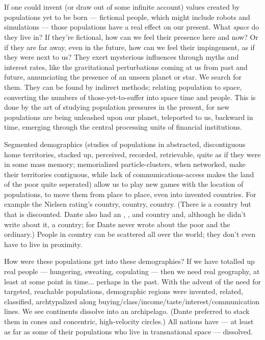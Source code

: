 \chapter{}

If one could invent (or draw out of some
infinite account) values created by populations yet to be born --- fictional people, which
might include robots and simulations --- those
populations have a real effect on our present.
What \emph{space} do they live in? If they're fictional, how can we feel their presence here
and now? Or if they are far away, even in the future, how can we feel their impingement,
as if they were next to us? They exert mysterious influences through myths and interest rates, like the gravitational perturbations
coming at us from past and future,
annunciating the presence of an unseen
planet or star. We search for them. They can
be found by indirect methods; relating population to space, converting the numbers of
those-yet-to-suffer into space time and people. This is done by the art of studying
population pressures in the present, for new
populations are being unleashed upon our
planet, teleported to us, backward
in time, emerging through the central processing
units of financial institutions.

Segmented demographics (studies of populations
in abstracted, discontiguous home territories, stacked up, perceived, recorded,
retrievable, quite as if they were in some mass
memory; memorialized particle-clusters, when networked, make their territories contiguous, while lack of communications-access makes the land of the poor quite seperated) allow us to play new games with the
location of populations, to move them from place to place, even into invented countries.
For example the Nielsen rating's \cA country, \cB country, \cC country. (There is a \cD country
but that is discounted. Dante also had an \cA, \cB, and \cC country and, although he didn't
write about it, a \cD country; for Dante never wrote about the poor and the ordinary.)
People in \cA country can be scattered all over
the world; they don't even have to live in
proximity.

How were these populations get into these demographies? If we have totalled up real people --- hungering, sweating, copulating --- then we need real geography, at least at some point in time... perhaps in the past. With the advent of the need for targeted, reachable populations, demographic regions were invented, related, classified, archtypalized along buying\slash class\slash income\slash taste\slash interest\slash communication lines. We see continents dissolve into an archipelago. (Dante preferred to stack them in cones and concentric, high-velocity circles.) All nations have --- at least as far as some of their populations who live in transnational space --- dissolved.

